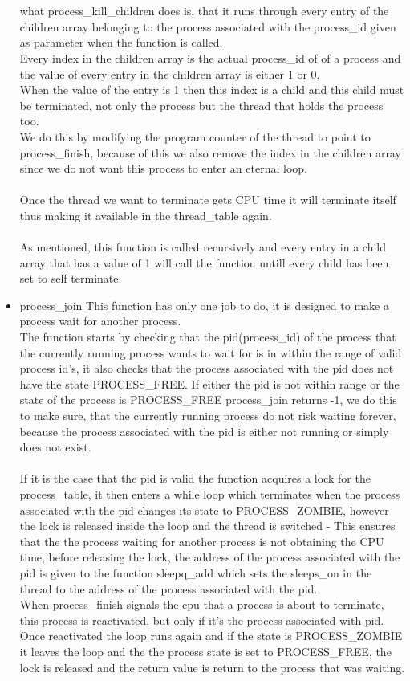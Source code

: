 \documentclass[a4paper,12pt,danish]{report}
\begin{document}
\begin{itemize}
  \\
  \\
  what process\_kill\_children does is, that it runs through every entry of the children array belonging to the process associated with the process\_id given as parameter when the function is called.
  \\
  Every index in the children array is the actual process\_id of of a process and the value of every entry in the children array is either 1 or 0.
  \\
  When the value of the entry is 1 then this index is a child and this child must be terminated, not only the process but the thread that holds the process too.
  \\
  We do this by modifying the program counter of the thread to point to process\_finish, because of this we also remove the index in the children array since we do not want this process to enter an eternal loop.
  \\
  \\
  Once the thread we want to terminate gets CPU time it will terminate itself thus making it available in the thread\_table again.
  \\
  \\
  As mentioned, this function is called recursively and every entry in a child array that has a value of 1 will call the function untill every child has been set to self terminate.
  \item{process\_join}
  This function has only one job to do, it is designed to make a process wait for another process.
  \\
  The function starts by checking that the pid(process\_id) of the process that the currently running process wants to wait for is in within the range of valid process id's, it also checks that the process associated with the pid does not have the state PROCESS\_FREE.
  If either the pid is not within range or the state of the process is PROCESS\_FREE process\_join returns -1, we do this to make sure, that the currently running process do not risk waiting forever, because the process associated with the pid is either not running or simply does not exist.
  \\
  \\
  If it is the case that the pid is valid the function acquires a lock for the process\_table, it then enters a while loop which terminates when the process associated with the pid changes its state to PROCESS\_ZOMBIE, however the lock is released inside the loop and the thread is switched - This ensures that the the process waiting for another process is not obtaining the CPU time, before releasing the lock, the address of the process associated with the pid is given to the function sleepq\_add which sets the sleeps\_on in the thread to the address of the process associated with the pid.
  \\
  When process\_finish signals the cpu that a process is about to terminate, this process is reactivated, but only if it's the process associated with pid. Once reactivated the loop runs again and if the state is PROCESS\_ZOMBIE it leaves the loop and the the process state is set to PROCESS\_FREE, the lock is released and the return value is return to the process that was waiting.
\end{itemize}
\end{document}
